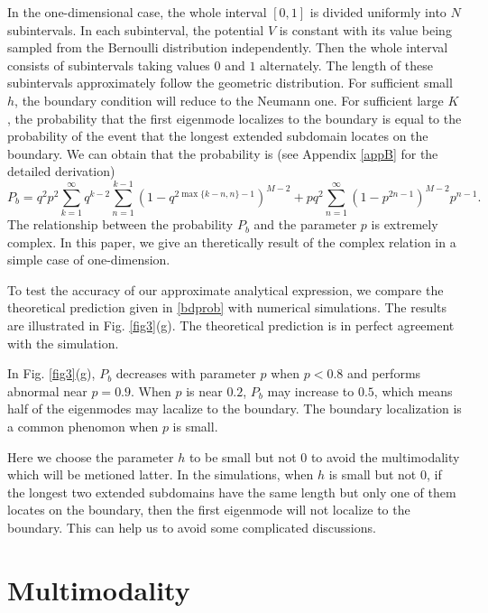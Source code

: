 \documentclass[a4paper,11pt]{article}
\begin{document}
In the one-dimensional case, the whole interval $[0, 1]$ is divided uniformly into $N$ subintervals. In each subinterval, the potential $V$ is constant with its value being sampled from the Bernoulli distribution independently. Then the whole interval consists of subintervals taking values $0$ and $1$ alternately. The length of these subintervals approximately follow the geometric distribution. For sufficient small $h$, the boundary condition will reduce to the Neumann one. For sufficient large $K$, the probability that the first eigenmode localizes to the boundary is equal to the probability of the event that the longest extended subdomain locates on the boundary. We can obtain that the probability is (see Appendix \ref{appB} for the detailed derivation)
\begin{equation}\label{bdprob}
P_b = q^2 p^2 \sum_{k=1}^{\infty} q^{k-2} \sum_{n=1}^{k-1} (1 - q^{2 \max\{k-n,n\}-1})^{M-2} + p q^2 \sum_{n=1}^{\infty} (1 - p^{2 n-1})^{M-2} p^{n-1}.
\end{equation}
The relationship between the probability $P_b$ and the parameter $p$ is extremely complex. In this paper, we give an theretically result of the complex relation in a simple case of one-dimension.

To test the accuracy of our approximate analytical expression, we compare the theoretical prediction given in \eqref{bdprob} with numerical simulations. The results are illustrated in Fig. \ref{fig3}(g). The theoretical prediction is in perfect agreement with the simulation.

In Fig. \ref{fig3}(g), $P_b$ decreases with parameter $p$ when $p<0.8$ and performs abnormal near $p=0.9$. When $p$ is near $0.2$, $P_b$ may increase to $0.5$, which means half of the eigenmodes may lacalize to the boundary. The boundary localization is a common phenomon when $p$ is small.

Here we choose the parameter $h$ to be small but not $0$ to avoid the multimodality which will be metioned latter. In the simulations, when $h$ is small but not $0$, if the longest two extended subdomains have the same length but only one of them locates on the boundary, then the first eigenmode will not localize to the boundary. This can help us to avoid some complicated discussions.


\section{Multimodality}
\end{document}
